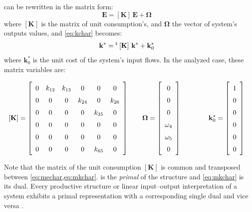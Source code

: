 \documentclass[energies,article,submit,moreauthors,pdftex]{Definitions/mdpi}
\newcommand{\vm}[1]{\ensuremath{\mathbf{#1}}}
\newcommand{\tm}{\ensuremath{\prescript{\smash{\mathsf{t}}}{}{\mskip1mu}}}
\begin{document}
 can be rewritten in the matrix form: 
\begin{equation}
    \vm{E}=\left[\vm{K}\right]\,\vm{E}+\vm{\Omega}
    \label{eq:mechar}
\end{equation}
where $\left[\vm{K}\right]$ is the matrix of unit consumption's, and $\vm{\Omega}$ the vector of system's outputs values, and \cref{eq:kchar} becomes:
\begin{equation}
    \vm{k}^* = \tm\left[\vm{K}\right]\,\vm{k}^* + \vm{k}_0^*
    \label{eq:mkchar}
\end{equation}
where $\vm{k}_0^*$ is the unit cost of the system's input flows. In the analyzed case, these matrix variables are:

\begin{equation*}
    \def\arraystretch{1.5}
    \left[\vm{K}\right]=\left[\begin{array}{cccccc}
    0 & k_{12} & k_{13} & 0 & 0 & 0 \\
    0 & 0 & 0 & k_{24} & 0 & k_{26} \\
    0 & 0 & 0 & 0 & k_{35} & 0 \\
    0 & 0 & 0 & 0 & 0 & 0 \\
    0 & 0 & 0 & 0 & 0 & 0 \\
    0 & 0 & 0 & 0 & k_{65} & 0
    \end{array}
    \right]
    \qquad
    \vm{\Omega}=\left[\begin{array}{c}
    0 \\
    0 \\
    0 \\
    \omega_4 \\
    \omega_5 \\
    0
    \end{array}
    \right]
    \qquad
    \qquad
    \vm{k}_0^*=\left[\begin{array}{c}
    1 \\
    0 \\
    0 \\
    0 \\
    0 \\
    0
    \end{array}
    \right]
\end{equation*}

Note that the matrix of the unit consumption $\left[\vm{K}\right]$ is common and transposed between \cref{eq:mechar,eq:mkchar}.  is the \emph{primal} of the structure and \cref{eq:mkchar} is its dual. Every productive structure or linear input–output interpretation of a system exhibits a primal representation with a corresponding single dual and vice versa \cite{Boyd2004}. 
\end{document}
